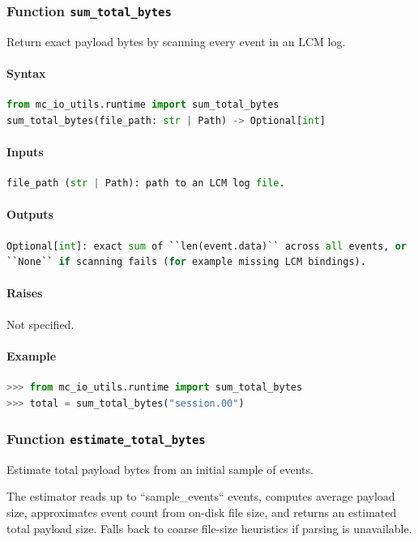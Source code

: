 \documentclass[11pt]{article}
\begin{document}
\subsubsection{Function \texttt{sum\_total\_bytes}}
Return exact payload bytes by scanning every event in an LCM log.

\paragraph{Syntax}
\begin{lstlisting}[language=Python]
from mc_io_utils.runtime import sum_total_bytes
sum_total_bytes(file_path: str | Path) -> Optional[int]
\end{lstlisting}
\paragraph{Inputs}
\begin{lstlisting}[language=Python]
file_path (str | Path): path to an LCM log file.
\end{lstlisting}
\paragraph{Outputs}
\begin{lstlisting}[language=Python]
Optional[int]: exact sum of ``len(event.data)`` across all events, or
``None`` if scanning fails (for example missing LCM bindings).
\end{lstlisting}
\paragraph{Raises}
Not specified.
\paragraph{Example}
\begin{lstlisting}[language=Python]
>>> from mc_io_utils.runtime import sum_total_bytes
>>> total = sum_total_bytes("session.00")
\end{lstlisting}

\subsubsection{Function \texttt{estimate\_total\_bytes}}
Estimate total payload bytes from an initial sample of events.

The estimator reads up to ``sample\_events`` events, computes average payload
size, approximates event count from on-disk file size, and returns an
estimated total payload size. Falls back to coarse file-size heuristics if
parsing is unavailable.
\end{document}
